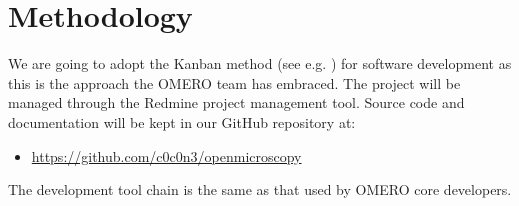 \section{Methodology}

We are going to adopt the Kanban method (see e.g. \cite{anderson:kanban}) for software
development as this is the approach the OMERO team has embraced. The project will be
managed through the Redmine\cite{redmine:www} project management tool. Source code and
documentation will be kept in our GitHub repository at: 
\begin{itemize}
\item \url{https://github.com/c0c0n3/openmicroscopy}
\end{itemize}

The development tool chain is the same as that used by OMERO core developers.
